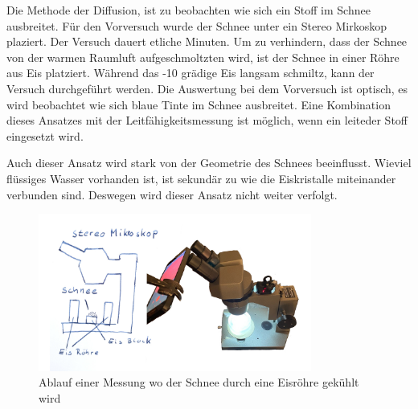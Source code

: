
Die Methode der Diffusion, ist zu beobachten wie sich ein Stoff im Schnee ausbreitet. Für den Vorversuch wurde der Schnee unter ein Stereo Mirkoskop plaziert. Der Versuch dauert etliche Minuten. Um zu verhindern, dass der Schnee von der warmen Raumluft aufgeschmoltzten wird, ist der Schnee in einer Röhre aus Eis platziert. Während das -10 grädige Eis langsam schmiltz, kann der Versuch durchgeführt werden. Die Auswertung bei dem Vorversuch ist optisch, es wird beobachtet wie sich blaue Tinte im Schnee ausbreitet. Eine Kombination dieses Ansatzes mit der Leitfähigkeitsmessung ist möglich, wenn ein leiteder Stoff eingesetzt wird.

Auch dieser Ansatz wird stark von der Geometrie des Schnees beeinflusst. Wieviel flüssiges Wasser vorhanden ist, ist sekundär zu wie die Eiskristalle miteinander verbunden sind. Deswegen wird dieser Ansatz nicht weiter verfolgt.

\begin{figure}
    \centering
    \includegraphics[width=0.8\textwidth]{Bilder/freistellen.jpeg}
    \caption{Ablauf einer Messung wo der Schnee durch eine Eisröhre gekühlt wird}
    \label{fig:AutMess}
\end{figure}
